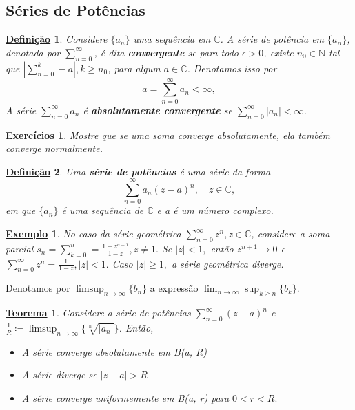 \documentclass{article}
\newtheorem*{def*}{\underline{Defini\c c\~ao}}
\newtheorem*{theorem*}{\underline{Teorema}}
\newtheorem{example}{\underline{Exemplo}}[section]
\newtheorem*{exer*}{\underline{Exerc\'icios}}
\begin{document}
  \subsection{S\'eries de Pot\^encias}
  \begin{def*}
    Considere $\{a_{n}\}$ uma sequ\^encia em $\mathbb{C}$. A s\'erie de pot\^encia em $\{a_n\}$, denotada
    por $\sum\limits_{n=0}^{\infty}$, \'e dita \textbf{convergente} se para todo $\epsilon > 0$, existe $n_0\in\mathbb{N}$
    tal que $|\sum\limits_{n=0}^{k} - a|, k\geq{n_0}$, para algum $a\in\mathbb{C}$. Denotamos isso por 
    $$
    a = \sum_{n=0}^{\infty} a_n < \infty,
    $$
    A s\'erie $\sum\limits_{n=0}^{\infty}a_n$ \'e \textbf{absolutamente convergente} se $\sum\limits_{n=0}^{\infty}|a_n|<\infty$.
  \end{def*}
  \begin{exer*}
    Mostre que se uma soma converge absolutamente, ela tamb\'em converge normalmente.
  \end{exer*}
  \begin{def*}
    Uma \textbf{s\'erie de pot\^encias} \'e uma s\'erie da forma
    $$
    \sum_{n=0}^{\infty}a_n(z-a)^n, \quad z\in\mathbb{C},
    $$
    em que $\{a_n\}$ \'e uma sequ\^encia de $\mathbb{C}$ e a \'e um n\'umero complexo.
  \end{def*}
  \begin{example}
    No caso da s\'erie geom\'etrica $\sum\limits_{n=0}^{\infty}z^n, z\in\mathbb{C}$, considere
    a soma parcial $s_n = \sum\limits_{k=0}^{n} = \frac{1 - z^{n+1}}{1-z}, z\neq{1}.$ Se
    $|z| < 1,$ ent\~ao $z^{n+1}\to{0}$ e $\sum\limits_{n=0}^{\infty}z^n = \frac{1}{1-z}, |z| < 1.$
    Caso $|z|\geq{1},$ a s\'erie geom\'etrica diverge.
  \end{example}
  Denotamos por $\limsup_{n\to\infty}\{b_n\}$ a express\~ao $\lim_{n\to\infty}\sup_{k\geq{n}}\{b_k\}$.
  \begin{theorem*}
    Considere a s\'erie de pot\^encias $\sum\limits_{n=0}^{\infty}(z-a)^n$ e $\frac{1}{R}\coloneqq \limsup_{n\to\infty}\{\sqrt[n]{|a_n|}\}$.
    Ent\~ao, 
    \begin{itemize}
      \item[1)] A s\'erie converge absolutamente em B(a, R)
      \item[2)] A s\'erie diverge se $|z-a| > R$
      \item[3)] A s\'erie converge uniformemente em B(a, r) para $0 < r < R.$
    \end{itemize}
  \end{theorem*}
\end{document}
